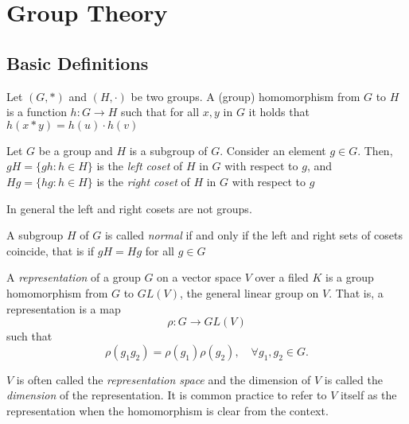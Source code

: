 \chapter{Group Theory}
\section{Basic Definitions}

\begin{definition}
Let $(G, *)$ and $(H,\cdot)$ be two groups. A (group) homomorphism from $G$ to $H$ is a function $h:G\rightarrow H$ such that for all $x,y$ in $G$ it holds that
$h(x*y) = h(u)\cdot h(v)$
\end{definition}

\begin{definition}[Coset]
Let $G$ be a group and $H$ is a subgroup of $G$. Consider an element $g \in G$. Then, $gH = \{ gh : h\in H\}$ is the \textit{left coset} of $H$ in $G$ with respect to $g$, and $Hg = \{hg : h\in H\}$ is the \textit{right coset} of $H$ in $G$ with respect to $g$
\end{definition}

\begin{remark}
In general the left and right cosets are not groups.
\end{remark}

\begin{definition}
A subgroup $H$ of $G$ is called \textit{normal} if and only if the left and right sets of cosets coincide, that is if $gH = Hg$ for all $g\in G$ 
\end{definition}

\begin{definition}[Representation]
  A \textit{representation} of a group $G$ on a vector space $V$ over a filed
  $K$ is a group homomorphism from $G$ to $GL(V)$, the general linear group on
  $V$. That is, a representation is a map
  \begin{equation}
    \rho:G\rightarrow GL(V)
  \end{equation}
such that
\begin{equation}
  \rho(g_1g_2) = \rho(g_1)\rho(g_2), \quad \forall g_1,g_2 \in G.
\end{equation}
\end{definition}

$V$ is often called the \textit{representation space} and the dimension of $V$
is called the \textit{dimension} of the representation. It is common practice
to refer to $V$ itself as the representation when the homomorphism is clear
from the context.

